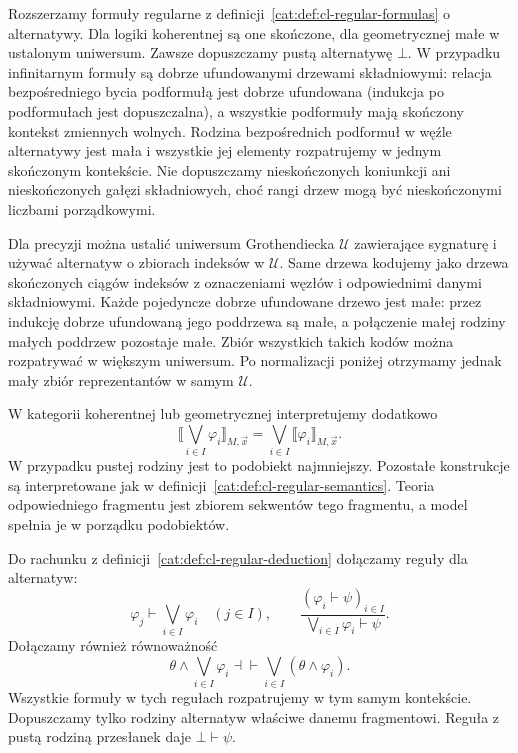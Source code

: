 Rozszerzamy formuły regularne z definicji~\ref{cat:def:cl-regular-formulas} o alternatywy. Dla logiki koherentnej są one skończone, dla geometrycznej małe w ustalonym uniwersum. Zawsze dopuszczamy pustą alternatywę $\bot$. W przypadku infinitarnym formuły są dobrze ufundowanymi drzewami składniowymi: relacja bezpośredniego bycia podformułą jest dobrze ufundowana (indukcja po podformułach jest dopuszczalna), a wszystkie podformuły mają skończony kontekst zmiennych wolnych. Rodzina bezpośrednich podformuł w węźle alternatywy jest mała i wszystkie jej elementy rozpatrujemy w jednym skończonym kontekście. Nie dopuszczamy nieskończonych koniunkcji ani nieskończonych gałęzi składniowych, choć rangi drzew mogą być nieskończonymi liczbami porządkowymi.

Dla precyzji można ustalić uniwersum Grothendiecka $\mathcal U$ zawierające sygnaturę i używać alternatyw o zbiorach indeksów w $\mathcal U$. Same drzewa kodujemy jako drzewa skończonych ciągów indeksów z oznaczeniami węzłów i odpowiednimi danymi składniowymi. Każde pojedyncze dobrze ufundowane drzewo jest małe: przez indukcję dobrze ufundowaną jego poddrzewa są małe, a połączenie małej rodziny małych poddrzew pozostaje małe. Zbiór wszystkich takich kodów można rozpatrywać w większym uniwersum. Po normalizacji poniżej otrzymamy jednak mały zbiór reprezentantów w samym $\mathcal U$.

\begin{definicja}\label{cat:def:cl-geometric-semantics}
W kategorii koherentnej lub geometrycznej interpretujemy dodatkowo
\[
 \llbracket\bigvee_{i\in I}\varphi_i\rrbracket_{M,\vec x}
 =\bigvee_{i\in I}\llbracket\varphi_i\rrbracket_{M,\vec x}.
\]
W przypadku pustej rodziny jest to podobiekt najmniejszy. Pozostałe konstrukcje są interpretowane jak w definicji~\ref{cat:def:cl-regular-semantics}. Teoria odpowiedniego fragmentu jest zbiorem sekwentów tego fragmentu, a model spełnia je w porządku podobiektów.
\end{definicja}

\begin{definicja}\label{cat:def:cl-geometric-deduction}
Do rachunku z definicji~\ref{cat:def:cl-regular-deduction} dołączamy reguły dla alternatyw:
\[
 \varphi_j\vdash\bigvee_{i\in I}\varphi_i\quad(j\in I),
 \qquad
 \frac{(\varphi_i\vdash\psi)_{i\in I}}
      {\bigvee_{i\in I}\varphi_i\vdash\psi}.
\]
Dołączamy również równoważność
\[
 \theta\wedge\bigvee_{i\in I}\varphi_i
 \dashv\vdash
 \bigvee_{i\in I}(\theta\wedge\varphi_i).
\]
Wszystkie formuły w tych regułach rozpatrujemy w tym samym kontekście. Dopuszczamy tylko rodziny alternatyw właściwe danemu fragmentowi. Reguła z pustą rodziną przesłanek daje $\bot\vdash\psi$.
\end{definicja}

